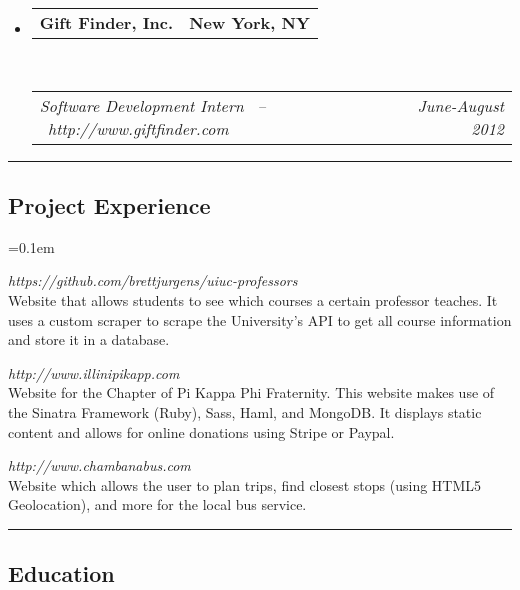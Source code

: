 \documentclass[10pt,letterpaper]{article}
\makeatletter
\newcommand{\headerrow}[2]
{\begin{tabular*}{\linewidth}{l@{\extracolsep{\fill}}r}
	#1 &
	#2 \\
\end{tabular*}}
\makeatother
\begin{document}
\begin{itemize}
	\item
	\headerrow
		{\textbf{Gift Finder, Inc.}}
		{\textbf{New York, NY}}
	\\
	\headerrow
		{\emph{Software Development Intern \ -- \ http://www.giftfinder.com}}
		{\emph{June-August 2012}}
	\vspace{-1.5em}

\end{itemize}

\hrule
\vspace{-0.4em}
\subsection*{Project Experience}
\begin{description}[leftmargin=0pt]
	\parskip=0.1em
      
	\item[UIUC Professors] {\emph{https://github.com/brettjurgens/uiuc-professors}}\hfill\\
      Website that allows students to see which courses a certain professor 
      teaches. It uses a custom scraper to scrape the University's API to get 
      all course information and store it in a database.

      \item[Pi Kappa Phi Illinois Chapter] {\emph{http://www.illinipikapp.com}}\hfill\\
      Website for the Chapter of Pi Kappa Phi Fraternity. This website makes use of the
      Sinatra Framework (Ruby), Sass, Haml, and MongoDB. It displays static 
      content and allows for online donations using Stripe or Paypal.
      
	\item[Chambana Bus] {\emph{http://www.chambanabus.com}}\hfill\\
      Website which allows the user to plan trips, find closest stops (using HTML5 
	Geolocation), and more for the local bus service.
	
\end{description}

\hrule
\vspace{-0.4em}
\subsection*{Education}
\end{document}
